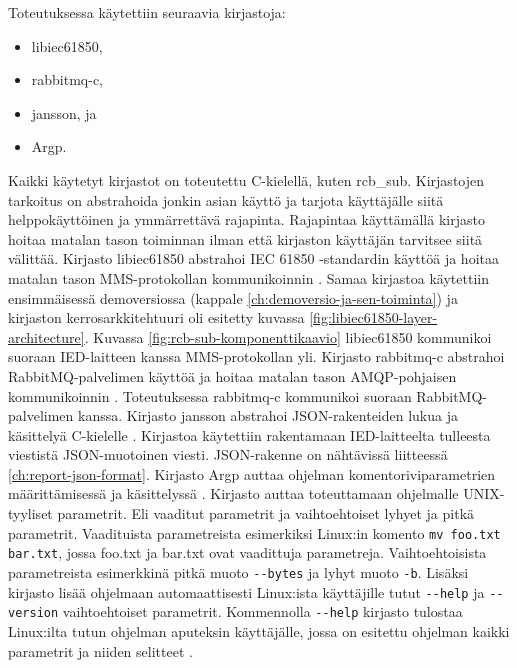 Toteutuksessa käytettiin seuraavia kirjastoja:
\begin{itemize}
	\item libiec61850,
	\item rabbitmq-c,
	\item jansson, ja
	\item Argp.
\end{itemize}
Kaikki käytetyt kirjastot on toteutettu C-kielellä, kuten rcb\_sub. Kirjastojen tarkoitus on abstrahoida jonkin asian käyttö ja tarjota käyttäjälle siitä helppokäyttöinen ja ymmärrettävä rajapinta. Rajapintaa käyttämällä kirjasto hoitaa matalan tason toiminnan ilman että kirjaston käyttäjän tarvitsee siitä välittää. Kirjasto libiec61850 abstrahoi IEC 61850 -standardin käyttöä ja hoitaa matalan tason MMS-protokollan kommunikoinnin \mbox{\cite{libIEC61850-repo}}. Samaa kirjastoa käytettiin ensimmäisessä demoversiossa (kappale \ref{ch:demoversio-ja-sen-toiminta}) ja kirjaston kerrosarkkitehtuuri oli esitetty kuvassa \ref{fig:libiec61850-layer-architecture}. Kuvassa \ref{fig:rcb-sub-komponenttikaavio} libiec61850 kommunikoi suoraan IED-laitteen kanssa MMS-protokollan yli. Kirjasto rabbitmq-c abstrahoi RabbitMQ-palvelimen käyttöä ja hoitaa matalan tason AMQP-pohjaisen kommunikoinnin \mbox{\cite{rabbitmq-c-repo}}. Toteutuksessa rabbitmq-c kommunikoi suoraan RabbitMQ-palvelimen kanssa. Kirjasto jansson abstrahoi JSON-rakenteiden lukua ja käsittelyä C-kielelle \mbox{\cite{jansson-repo}}. Kirjastoa käytettiin rakentamaan IED-laitteelta tulleesta viestistä JSON-muotoinen viesti. JSON-rakenne on nähtävissä liitteessä \ref{ch:report-json-format}. Kirjasto Argp auttaa ohjelman komentoriviparametrien määrittämisessä ja käsittelyssä \mbox{\cite{argp-glibc-guide}}. Kirjasto auttaa toteuttamaan ohjelmalle UNIX-tyyliset parametrit. Eli vaaditut parametrit ja vaihtoehtoiset lyhyet ja pitkä parametrit. Vaadituista parametreista esimerkiksi Linux:in komento \texttt{mv foo.txt bar.txt}, jossa foo.txt ja bar.txt ovat vaadittuja parametreja. Vaihtoehtoisista parametreista esimerkkinä pitkä muoto \texttt{-{}-bytes} ja lyhyt muoto \texttt{-b}. Lisäksi kirjasto lisää ohjelmaan automaattisesti Linux:ista käyttäjille tutut \texttt{-{}-help} ja \texttt{-{}-version} vaihtoehtoiset parametrit. Kommennolla \texttt{-{}-help} kirjasto tulostaa Linux:ilta tutun ohjelman aputeksin käyttäjälle, jossa on esitettu ohjelman kaikki parametrit ja niiden selitteet \mbox{\cite{step-by-step-into-argp}}.

